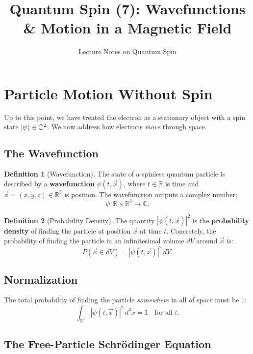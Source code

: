 \documentclass[11pt,a4paper]{article}
\title{\textbf{Quantum Spin (7): Wavefunctions \& Motion in a Magnetic Field}}
\author{Lecture Notes on Quantum Spin}
\date{}
\theoremstyle{definition}
\newtheorem{definition}{Definition}[section]
\theoremstyle{plain}
\theoremstyle{remark}
\begin{document}
\maketitle
\tableofcontents
\newpage

\section{Particle Motion Without Spin}

Up to this point, we have treated the electron as a stationary object with a spin state $\ket{\psi} \in \mathbb{C}^2$. We now address how electrons \emph{move} through space.

\subsection{The Wavefunction}

\begin{definition}[Wavefunction]
    The state of a spinless quantum particle is described by a \textbf{wavefunction} $\psi(t, \vec{x})$, where $t \in \mathbb{R}$ is time and $\vec{x} = (x,y,z) \in \mathbb{R}^3$ is position. The wavefunction outputs a complex number:
    \[
        \psi : \mathbb{R} \times \mathbb{R}^3 \to \mathbb{C}.
    \]
\end{definition}

\begin{definition}[Probability Density]
    The quantity $|\psi(t, \vec{x})|^2$ is the \textbf{probability density} of finding the particle at position $\vec{x}$ at time $t$. Concretely, the probability of finding the particle in an infinitesimal volume $dV$ around $\vec{x}$ is:
    \[
        P(\vec{x} \in dV) = |\psi(t, \vec{x})|^2\, dV.
    \]
\end{definition}

\subsection{Normalization}

The total probability of finding the particle \emph{somewhere} in all of space must be $1$:
\[
    \int_{\mathbb{R}^3} |\psi(t, \vec{x})|^2\, d^3x = 1 \quad \text{for all } t.
\]

\subsection{The Free-Particle Schr\"odinger Equation}
\end{document}
